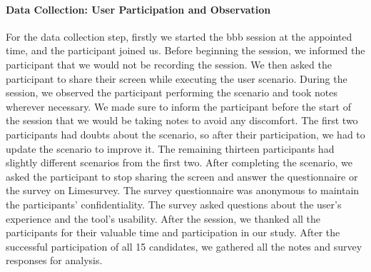 \paragraph{Data Collection: User Participation and Observation}
For the data collection step, firstly we started the \ac{bbb} session at the appointed time, and the participant joined us. 
Before beginning the session, we informed the participant that we would not be recording the session. 
We then asked the participant to share their screen while executing the user scenario.
During the session, we observed the participant performing the scenario and took notes wherever necessary. 
We made sure to inform the participant before the start of the session that we would be taking notes to avoid any discomfort. 
The first two participants had doubts about the scenario, so after their participation, we had to update the scenario to improve it. 
The remaining thirteen participants had slightly different scenarios from the first two.
After completing the scenario, we asked the participant to stop sharing the screen and answer the questionnaire or the survey on Limesurvey. 
The survey questionnaire was anonymous to maintain the participants' confidentiality. 
The survey asked questions about the user's experience and the tool's usability.
After the session, we thanked all the participants for their valuable time and participation in our study. 
After the successful participation of all 15 candidates, we gathered all the notes and survey responses for analysis.


